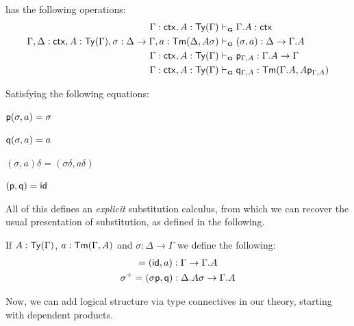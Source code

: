 \begin{definition}[Projections]
    \ThyGAT has the following operations:
    \begin{align*}
        \Gamma : \ctx, A : \Type(\Gamma) &\vdashG \Gamma.A : \ctx\\
        \Gamma, \Delta : \ctx, A : \Type(\Gamma), \sigma : \Delta \rightarrow \Gamma, a: \Elem(\Delta,A\sigma) &\vdashG (\sigma,a) : \Delta  \rightarrow \Gamma.A\\
        \Gamma : \ctx, A : \Type(\Gamma) &\vdashG \p_{\Gamma,A} : \Gamma.A \rightarrow \Gamma \\
        \Gamma : \ctx, A : \Type(\Gamma) &\vdashG \q_{\Gamma,A} : \Elem(\Gamma.A, A\p_{\Gamma,A})
    \end{align*}

    Satisfying the following equations:
    
    \begin{minipage}{0.20\linewidth}
        $\mathsf{p}(\sigma,a) = \sigma$
    \end{minipage}
    \hfill
    \begin{minipage}{0.20\linewidth}
            $\mathsf{q}(\sigma,a) = a$
    \end{minipage}
    \hfill
    \begin{minipage}{0.20\linewidth}
            $(\sigma,a)\delta = (\sigma \delta, a\delta)$
    \end{minipage}
    \hfill
    \begin{minipage}{0.20\linewidth}
            $(\mathsf{p},\mathsf{q}) = \mathsf{id}$
    \end{minipage}

\end{definition}

All of this defines an \textit{explicit} substitution calculus, from which
we can recover the usual presentation of substitution, as defined in the following.

\begin{definition}
    If $A : \mathsf{Ty}(\Gamma)$, $a : \mathsf{Tm}(\Gamma,A)$ and $\sigma : \Delta \rightarrow \Gamma$ we define the following: 
    \begin{gather*}
        [a] = (\Id,a) : \Gamma \rightarrow \Gamma.A\\
        \sigma^+ = (\sigma\p,\q) : \Delta.A\sigma \rightarrow \Gamma.A
    \end{gather*}
\end{definition}

Now, we can add logical structure via type connectives in our theory, starting with dependent products.

